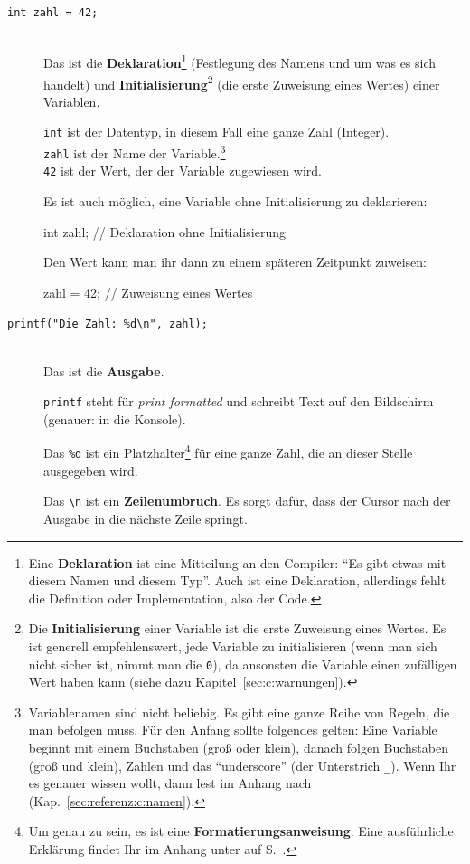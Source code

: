 \begin{description}
    \item[\texttt{int zahl = 42;}]\hfill\\
        Das ist die \textbf{Deklaration}\protect\footnote{%
            Eine \textbf{Deklaration} ist eine Mitteilung an den Compiler: ``Es gibt etwas mit diesem Namen und diesem Typ''. Auch ist  eine Deklaration, allerdings fehlt die Definition oder Implementation, also der Code.
        } (Festlegung des Namens und um was es sich handelt) und 
        \textbf{Initialisierung}\protect\footnote{%
            Die \textbf{Initialisierung} einer Variable ist die erste Zuweisung eines Wertes. Es ist generell empfehlenswert, jede Variable zu initialisieren (wenn man sich nicht sicher ist, nimmt man die \texttt{0}), da ansonsten die Variable einen zufälligen Wert haben kann (siehe dazu Kapitel~\ref{sec:c:warnungen}).
        } (die erste Zuweisung eines Wertes) einer Variablen.

        \texttt{int} ist der Datentyp, in diesem Fall eine ganze Zahl (Integer).\\
        \texttt{zahl} ist der Name der Variable.\protect\footnote{
            Variablenamen sind nicht beliebig. Es gibt eine ganze Reihe von Regeln, die man befolgen muss. Für den Anfang sollte folgendes gelten: Eine Variable beginnt mit einem Buchstaben (groß oder klein), danach folgen Buchstaben (groß und klein), Zahlen und das ``underscore'' (der Unterstrich \texttt{\_}). Wenn Ihr es genauer wissen wollt, dann lest im Anhang nach (Kap.~\ref{sec:referenz:c:namen}).
        }\\
        \texttt{42} ist der Wert, der der Variable zugewiesen wird.

        Es ist auch möglich, eine Variable ohne Initialisierung zu deklarieren:
\begin{code}[numbers=none]
  int zahl; // Deklaration ohne Initialisierung
\end{code}
        Den Wert kann man ihr dann zu einem späteren Zeitpunkt zuweisen:
\begin{code}[numbers=none]
  zahl = 42; // Zuweisung eines Wertes
\end{code} 
    \item[\texttt{printf("Die Zahl: \%d\backslash n", zahl);}]\hfill\\
        Das ist die \textbf{Ausgabe}.

        \texttt{printf} steht für \textit{print formatted} und schreibt Text
        auf den Bildschirm (genauer: in die Konsole).

        Das \texttt{\%d} ist ein Platzhalter\footnote{%
            Um genau zu sein, es ist eine \textbf{Formatierungsanweisung}. Eine ausführliche Erklärung findet Ihr im Anhang unter  auf S.~.
        } für eine ganze Zahl, die an dieser Stelle ausgegeben wird.

        Das \texttt{\backslash n} ist ein \textbf{Zeilenumbruch}.
        Es sorgt dafür, dass der Cursor nach der Ausgabe in die nächste Zeile springt.
\end{description}

